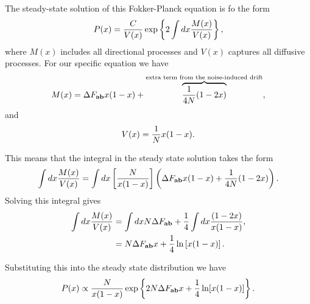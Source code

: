 The steady-state solution of this Fokker-Planck equation is fo the form
\begin{equation}
  P(x) = {C \over V(x)} \exp \left\{ 2 \int dx {M(x) \over V(x)} \right\},
\end{equation}
where $M(x)$ includes all directional processes and $V(x)$ captures all
diffusive processes. For our specific equation we have
\begin{equation}
  M(x) = \Delta F_{\mathbf{ab}} x (1 - x) + \overbrace{{1 \over 4N} (1 - 2x)}^
  {\text{extra term from the noise-induced drift}},
\end{equation}
and
\begin{equation}
  V(x) = {1 \over N} x (1 - x).
\end{equation}

This means that the integral in the steady state solution takes the form
\begin{equation}
  \int dx {M(x) \over V(x)} = \int dx \left[ {N \over x (1 - x)} \right]
  \left( \Delta F_{\mathbf{ab}} x (1 - x) + {1 \over 4N} (1 - 2x) \right).
\end{equation}
Solving this integral gives
\begin{align}
  \int dx {M(x) \over V(x)} &= \int dx N \Delta F_{\mathbf{ab}} +
  {1 \over 4} \int dx {(1 - 2x) \over x (1 - x)}, \\
  &= N \Delta F_{\mathbf{ab}} x + {1 \over 4} \ln \left[ x ( 1 - x) \right].
\end{align}

Substituting this into the steady state distribution we have
\begin{equation}
  P(x) \propto {N \over x (1 - x)} \exp \left\{ 2N \Delta F_{\mathbf{ab}} x +
  {1 \over 4} \ln[x (1 - x)] \right\}.
\end{equation}


